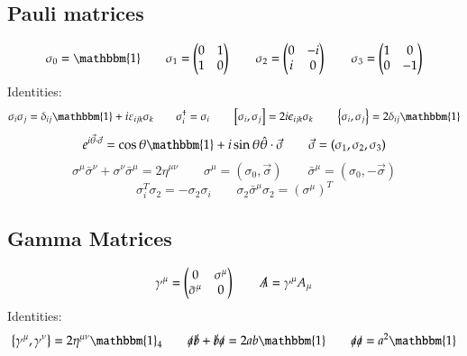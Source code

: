 \documentclass{article}
\begin{document}
\subsection{Pauli matrices}
\begin{equation*}
    \sigma_0 = \mathbbm{1}
    \qquad
    \sigma_1 = \begin{pmatrix} 0 & 1 \\ 1 & 0 \end{pmatrix}
    \qquad
    \sigma_2 = \begin{pmatrix} 0 & -i \\ i & 0 \end{pmatrix}
    \qquad
    \sigma_3 = \begin{pmatrix} 1 & 0 \\ 0 & -1 \end{pmatrix}
\end{equation*}
Identities:
\begin{equation*}
    \sigma_i \sigma_j = \delta_{ij} \mathbbm{1} + i\varepsilon_{ijk} \sigma_k
    \qquad
    \sigma_i^\dagger = \sigma_i
    \qquad
    \left[\sigma_i, \sigma_j\right] = 2i\epsilon_{ijk}\sigma_k
    \qquad
    \left\{\sigma_i, \sigma_j\right\} = 2\delta_{ij} \mathbbm{1}
\end{equation*}
\begin{equation*}
    e^{i\vec{\theta}\cdot\vec{\sigma}} = \cos\theta \mathbbm{1} + i\sin\theta \hat{\theta}\cdot\vec{\sigma}
    \qquad
    \vec{\sigma} = (\sigma_1, \sigma_2, \sigma_3)
\end{equation*}
\begin{equation*}
    \sigma^\mu\bar{\sigma}^\nu + \sigma^\nu\bar{\sigma}^\mu = 2\eta^{\mu\nu}
    \qquad
    \sigma^\mu = (\sigma_0, \vec{\sigma})
    \qquad
    \bar{\sigma}^\mu = (\sigma_0, -\vec{\sigma})
\end{equation*}
\begin{equation*}
    \sigma_i^T\sigma_2 = -\sigma_2\sigma_i
    \qquad
    \sigma_2 \bar{\sigma}^\mu\sigma_2 = \left(\sigma^\mu\right)^T
\end{equation*}

\subsection{Gamma Matrices}
\begin{equation*}
    \gamma^\mu = \begin{pmatrix}
        0 & \sigma^\mu \\ \bar{\sigma}^\mu & 0
    \end{pmatrix}
    \qquad
    \slashed{A} = \gamma^\mu A_\mu
\end{equation*}
Identities:
\begin{equation*}
    \left\{\gamma^\mu, \gamma^\nu\right\} = 2\eta^{\mu\nu}\mathbbm{1}_4
    \qquad
    \slashed{a}\slashed{b} + \slashed{b}\slashed{a} = 2ab\mathbbm{1}
    \qquad
    \slashed{a}\slashed{a} = a^2\mathbbm{1}
\end{equation*}
\end{document}
